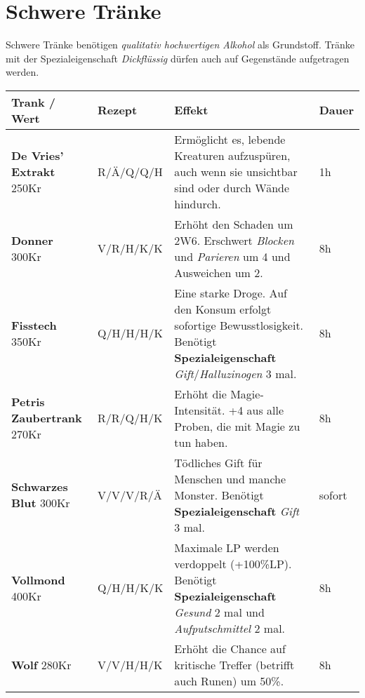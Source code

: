 \newpage

\section{Schwere Tränke}
Schwere Tränke benötigen \textit{qualitativ hochwertigen Alkohol} als Grundstoff. Tränke mit der Spezialeigenschaft \textit{Dickflüssig} dürfen auch auf Gegenstände aufgetragen werden.

\begin{longtable}{|p{3cm}|p{}|p{8cm}|p{}|}
\hline
\textbf{Trank} / Wert & \textbf{Rezept} & \textbf{Effekt} & \textbf{Dauer} \\ \hline

\textbf{De Vries' Extrakt} \newline 250Kr & R/Ä/Q/Q/H & Ermöglicht es, lebende Kreaturen aufzuspüren, auch wenn sie unsichtbar sind oder durch Wände hindurch. & 1h \\ \hline

\textbf{Donner} \newline 300Kr & V/R/H/K/K & Erhöht den Schaden um 2W6. Erschwert \textit{Blocken} und \textit{Parieren} um 4 und Ausweichen um 2. & 8h \\ \hline 

\textbf{Fisstech} \newline 350Kr & Q/H/H/H/K & Eine starke Droge. Auf den Konsum erfolgt sofortige Bewusstlosigkeit. Benötigt \textbf{Spezialeigenschaft} \textit{Gift}/\textit{Halluzinogen} 3 mal. & 8h \\ \hline

\textbf{Petris Zaubertrank} \newline 270Kr & R/R/Q/H/K & Erhöht die Magie-Intensität. +4 aus alle Proben, die mit Magie zu tun haben. & 8h \\ \hline

\textbf{Schwarzes Blut} \newline 300Kr & V/V/V/R/Ä & Tödliches Gift für Menschen und manche Monster. Benötigt \textbf{Spezialeigenschaft} \textit{Gift} 3 mal. & sofort \\ \hline

\textbf{Vollmond} \newline 400Kr & Q/H/H/K/K & Maximale LP werden verdoppelt (+100\%LP). Benötigt \textbf{Spezialeigenschaft} \textit{Gesund} 2 mal und \textit{Aufputschmittel} 2 mal. & 8h \\ \hline

\textbf{Wolf} \newline 280Kr & V/V/H/H/K & Erhöht die Chance auf kritische Treffer (betrifft auch Runen) um 50\%. & 8h \\ \hline


\end{longtable}
